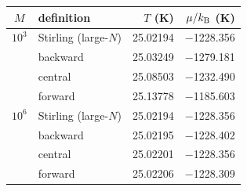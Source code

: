 \begin{tabular}{@{}c l r r@{}}
\toprule
$M$ & definition & $T$ (K) & $\mu/k_{\mathrm{B}}$ (K)\\
\midrule
$10^{3}$ & Stirling (large-$N$) & 25.02194 & $-$1228.356 \\
 & backward & 25.03249 & $-$1279.181 \\
 & central & 25.08503 & $-$1232.490 \\
 & forward & 25.13778 & $-$1185.603 \\
\midrule
$10^{6}$ & Stirling (large-$N$) & 25.02194 & $-$1228.356 \\
 & backward & 25.02195 & $-$1228.402 \\
 & central & 25.02201 & $-$1228.356 \\
 & forward & 25.02206 & $-$1228.309 \\
\bottomrule
\end{tabular}
